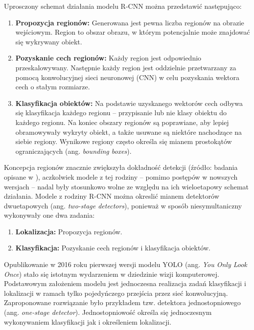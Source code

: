 Uprosczony schemat działania modelu R-CNN można przedstawić następująco:
\begin{enumerate}
    \item \textbf{Propozycja regionów:} Generowana jest pewna liczba regionów na obrazie wejściowym. Region to obszar obrazu, w którym potencjalnie może znajdować się wykrywany obiekt.
    \item \textbf{Pozyskanie cech regionów:} Każdy region jest odpowiednio przeskalowywany. Następnie każdy region jest oddzielnie przetwarzany za pomocą konwolucyjnej sieci neuronowej (CNN) w celu pozyskania wektora cech o stałym rozmiarze.
    \item \textbf{Klasyfikacja obiektów:} Na podstawie uzyskanego wektorów cech odbywa się klasyfikacja każdego regionu -- przypisanie lub nie klasy obiektu do każdego regionu. Na koniec obszary regionów są poprawiane, aby lepiej obramowywały wykryty obiekt, a także usuwane są niektóre nachodzące na siebie regiony. Wynikowe regiony często określa się mianem prostokątów ograniczających (ang. \emph{bounding boxes}).
\end{enumerate}

 Koncepcja regionów znacznie zwiększyła dokładność detekcji (źródło: badania opisane w \cite{RCNN, Fast-RCNN, Faster-RCNN}), aczkolwiek modele z tej rodziny -- pomimo postępów w nowszych wersjach -- nadal były stosunkowo wolne ze względu na ich wieloetapowy schemat działania. Modele z rodziny R-CNN można okreslić mianem detektorów dwuetapowych (ang. \emph{two-stage detectors}), ponieważ w sposób niesymultaniczny wykonywały one dwa zadania:
\begin{enumerate}
    \item \textbf{Lokalizacja:} Propozycja regionów.
    \item \textbf{Klasyfikacja:} Pozyskanie cech regionów i klasyfikacja obiektów.
\end{enumerate}

Opublikowanie w 2016 roku pierwszej wersji modelu YOLO (ang. \emph{You Only Look Once}) \cite{yolo_pierwszy_artykul} stało się istotnym wydarzeniem w dziedzinie wizji komputerowej. Podstawowym założeniem modelu jest jednoczesna realizacja zadań klasyfikacji i lokalizacji w ramach tylko pojedyńczego przejścia przez sieć konwolucyjną.  
Zaproponowane rozwiązanie było przykładem tzw. detektora jednostopniowego (ang. \emph{one-stage detector}). Jednostopniowość określa się jednoczesnym wykonywaniem klasyfikacji jak i określeniem lokalizacji.

